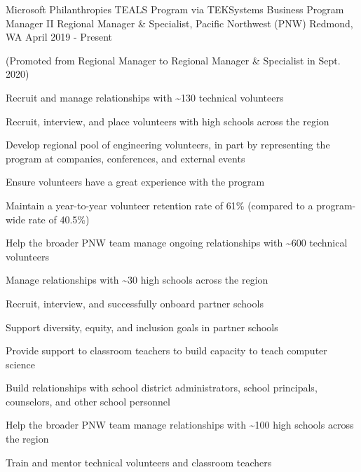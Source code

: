 \begin{cventries}

  \cventry
{Microsoft Philanthropies TEALS Program via TEKSystems}
    {Business Program Manager II
	\newline Regional Manager \& Specialist, Pacific Northwest (PNW)}
    {Redmond, WA}
    {April 2019 - Present}
    {(Promoted from Regional Manager to Regional Manager \& Specialist in Sept. 2020)\vspace{4mm}
      \begin{cvitems}
	\item Recruit and manage relationships with \~{}130 technical volunteers\\
	\begin{cvitems}
		\item Recruit, interview, and place volunteers with high schools across the region
		\item Develop regional pool of engineering volunteers, in part by representing the program at companies, conferences, and external events
		\item Ensure volunteers have a great experience with the program
		\item Maintain a year-to-year volunteer retention rate of 61\% (compared to a program-wide rate of 40.5\%)
		\item Help the broader PNW team manage ongoing relationships with \~{}600 technical volunteers
	\end{cvitems}
	\vspace{2mm}
	\item Manage relationships with \~{}30 high schools across the region\\
		\begin{cvitems}
		\item Recruit, interview, and successfully onboard partner schools
		\item Support diversity, equity, and inclusion goals in partner schools
		\item Provide support to classroom teachers to build capacity to teach computer science 
		\item Build relationships with school district administrators, school principals, counselors, and other school personnel
		\item Help the broader PNW team manage relationships with \~{}100 high schools across the region
	\end{cvitems}
	\vspace{2mm}
	\item Train and mentor technical volunteers and classroom teachers\\

\end{cvitems}}
\end{cventries}
